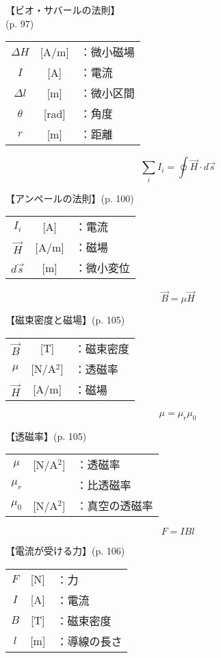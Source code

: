 \documentclass[10pt]{jarticle}
\begin{document}
\vskip3mm
【ビオ・サバールの法則】\\
\hfill {\footnotesize (p. 97)}

\begin{tabular}{ccl}
$\mathit{\Delta} H$	&[A/m]	&：微小磁場 \\
$I$	&[A]	&：電流\\
$\mathit{\Delta} l$	&[m]	&：微小区間\\
$\theta$	&[rad]	&：角度\\
$r$	&[m]	&：距離
\end{tabular}




\newpage
\[
\sum_i I_i = \oint \vec{H} \cdot d \vec{s}
\]


\vskip3mm
【アンペールの法則】\hfill {\footnotesize (p. 100)}

\begin{tabular}{ccl}
$I_i$	&[A]	&：電流\\
$\vec{H}$	&[A/m]	&：磁場\\
$d \vec{s}$	&[m]	&：微小変位
\end{tabular}




\newpage
\[
\vec{B} = \mu \vec{H}
\]


\vskip3mm
【磁束密度と磁場】{\footnotesize (p. 105)}

\begin{tabular}{ccl}
$\vec{B}$	&[T]	&：磁束密度\\
$\mu$	&[N/A$^2$]	&：透磁率\\
$\vec{H}$	&[A/m]	&：磁場
\end{tabular}




\newpage
\[
\mu = \mu_r \mu_0
\]


\vskip3mm
【透磁率】{\footnotesize (p. 105)}

\begin{tabular}{ccl}
$\mu$	&[N/A$^2$]	&：透磁率\\
$\mu_r$	&	&：比透磁率\\
$\mu_0$	&[N/A$^2$]	&：真空の透磁率
\end{tabular}




\newpage
\[
F = I B l
\]


\vskip3mm
【電流が受ける力】{\footnotesize (p. 106)}

\begin{tabular}{ccl}
$F$	&[N]	&：力 \\
$I$	&[A]	&：電流\\
$B$	&[T]	&：磁束密度\\
$l$	&[m]	&：導線の長さ\\
\end{tabular}
\end{document}
